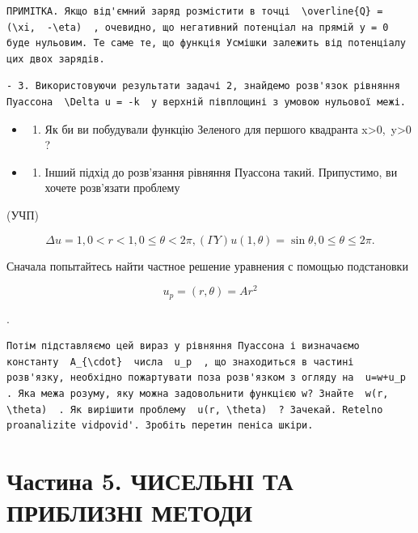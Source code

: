 \documentclass[
  ukrainian,
]{article}
\providecommand{\tightlist}{%
  \setlength{\itemsep}{0pt}\setlength{\parskip}{0pt}}
\begin{document}
\begin{verbatim}
ПРИМІТКА. Якщо від'ємний заряд розмістити в точці  \overline{Q} = (\xi,  -\eta)  , очевидно, що негативний потенціал на прямій y = 0 буде нульовим. Те саме те, що функція Усмішки залежить від потенціалу цих двох зарядів.
\end{verbatim}

\begin{verbatim}
- 3. Використовуючи результати задачі 2, знайдемо розв'язок рівняння Пуассона  \Delta u = -k  у верхній півплощині з умовою нульової межі.
\end{verbatim}

\begin{itemize}
\tightlist
\item
  \begin{enumerate}
  \def\labelenumi{\arabic{enumi}.}
  \setcounter{enumi}{3}
  \tightlist
  \item
    Як би ви побудували функцію Зеленого для першого квадранта
    x\textgreater0,~y\textgreater0 ?
  \end{enumerate}
\item
  \begin{enumerate}
  \def\labelenumi{\arabic{enumi}.}
  \setcounter{enumi}{4}
  \tightlist
  \item
    Інший підхід до розв'язання рівняння Пуассона такий. Припустимо, ви
    хочете розв'язати проблему
  \end{enumerate}
\end{itemize}

(УЧП)

\[
\Delta u = 1
,  0 < r < 1  ,  0 \le \theta < 2\pi  ,  (\Gamma Y)   u(1, \theta) = \sin \theta  ,  0 \le \theta \le 2\pi  .
\]

Сначала попытайтесь найти частное решение уравнения с помощью
подстановки

\[
u_p = (r, \theta) = Ar^2
\]

.

\begin{verbatim}
Потім підставляємо цей вираз у рівняння Пуассона і визначаємо константу  A_{\cdot}  числа  u_p  , що знаходиться в частині розв'язку, необхідно пожартувати поза розв'язком з огляду на  u=w+u_p  . Яка межа розуму, яку можна задовольнити функцією w? Знайте  w(r, \theta)  . Як вирішити проблему  u(r, \theta)  ? Зачекай. Retelno proanalizite vidpovid'. Зробіть перетин пеніса шкіри.
\end{verbatim}

\section{Частина 5. ЧИСЕЛЬНІ ТА ПРИБЛИЗНІ
МЕТОДИ}\label{ux447ux430ux441ux442ux438ux43dux430-5.-ux447ux438ux441ux435ux43bux44cux43dux456-ux442ux430-ux43fux440ux438ux431ux43bux438ux437ux43dux456-ux43cux435ux442ux43eux434ux438}
\end{document}
